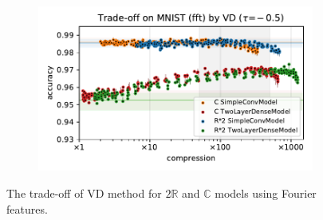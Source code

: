 \documentclass[a4paper,10pt,twocolumn]{article}
\newcommand{\real}{\mathbb{R}}
\newcommand{\cplx}{\mathbb{C}}
\begin{document}
\begin{figure}[b]
\begin{subfigure}[b]{0.5\columnwidth}
  \end{subfigure}%
  \begin{subfigure}[b]{0.5\columnwidth}
    \centering
    \includegraphics[width=\linewidth]{figure__mnist-like__trade-off/appendix__cmp__VD__mnist__fft__-0.5.pdf}
  \end{subfigure}
  \caption{%
    The trade-off of VD method for $2\real$ and $\cplx$ models using Fourier features.
  }
  \label{fig:appendix__cmp__mnist-like__trade-off__VD__fft}
\end{figure}
\end{document}
